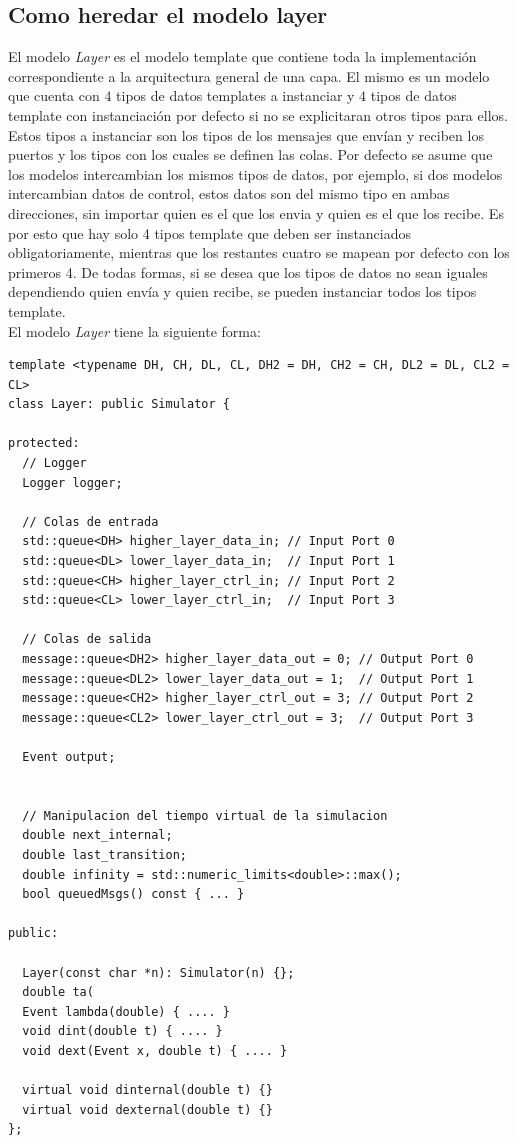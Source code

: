\documentclass[10pt,a4paper]{article}
\begin{document}
\subsection{Como heredar el modelo layer}

El modelo \textit{Layer} es el modelo template que contiene toda la implementación correspondiente a la arquitectura general de una capa. El mismo es un modelo que cuenta con $4$ tipos de datos templates a instanciar y $4$ tipos de datos template con instanciación por defecto si no se explicitaran otros tipos para ellos. Estos tipos a instanciar son los tipos de los mensajes que envían y reciben los puertos y los tipos con los cuales se definen las colas. Por defecto se asume que los modelos intercambian los mismos tipos de datos, por ejemplo, si dos modelos intercambian datos de control, estos datos son del mismo tipo en ambas direcciones, sin importar quien es el que los envia y quien es el que los recibe. Es por esto que hay solo 4 tipos template que deben ser instanciados obligatoriamente, mientras que los restantes cuatro se mapean por defecto con los primeros 4. De todas formas, si se desea que los tipos de datos no sean iguales dependiendo quien envía y quien recibe, se pueden instanciar todos los tipos template.\\

El modelo \textit{Layer} tiene la siguiente forma:
\begin{lstlisting}
template <typename DH, CH, DL, CL, DH2 = DH, CH2 = CH, DL2 = DL, CL2 = CL>
class Layer: public Simulator { 

protected:
  // Logger
  Logger logger;

  // Colas de entrada
  std::queue<DH> higher_layer_data_in; // Input Port 0
  std::queue<DL> lower_layer_data_in;  // Input Port 1
  std::queue<CH> higher_layer_ctrl_in; // Input Port 2 
  std::queue<CL> lower_layer_ctrl_in;  // Input Port 3
  
  // Colas de salida
  message::queue<DH2> higher_layer_data_out = 0; // Output Port 0 
  message::queue<DL2> lower_layer_data_out = 1;  // Output Port 1
  message::queue<CH2> higher_layer_ctrl_out = 3; // Output Port 2
  message::queue<CL2> lower_layer_ctrl_out = 3;  // Output Port 3

  Event output;


  // Manipulacion del tiempo virtual de la simulacion 
  double next_internal;
  double last_transition;
  double infinity = std::numeric_limits<double>::max();
  bool queuedMsgs() const { ... }

public:

  Layer(const char *n): Simulator(n) {};
  double ta(
  Event lambda(double) { .... }
  void dint(double t) { .... }
  void dext(Event x, double t) { .... }
  
  virtual void dinternal(double t) {}
  virtual void dexternal(double t) {}
};
\end{lstlisting}
\end{document}
